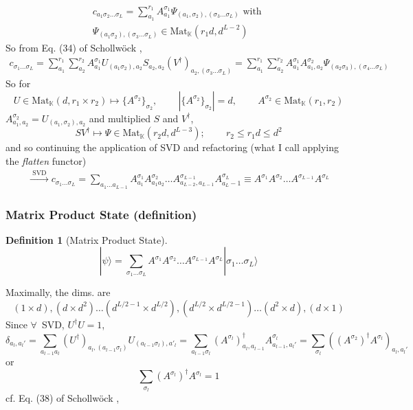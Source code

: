 \documentclass[10pt]{amsart}
\newtheorem{definition}{Definition}
\begin{document}
\begin{multicols*}{2}
\[
\begin{gathered}
c_{a_1\sigma_2 \dots \sigma_L } = \sum_{a_1}^{r_1} A_{a_1}^{\sigma_1} \Psi_{(a_1,\sigma_2),(\sigma_3\dots \sigma_L)} \text{ with } \\
\Psi_{(a_1\sigma_2),(\sigma_3\dots \sigma_L)}\in \text{Mat}_{\mathbb{K}}(r_1d,d^{L-2})
\end{gathered}
\]
So from Eq. (34) of  Schollw\"{o}ck \cite{Scho2010},
\begin{equation}
\begin{gathered}
	c_{\sigma_1 \dots \sigma_L} = \sum_{a_1}^{r_1} \sum_{a_2}^{r_2} A_{a_1}^{\sigma_1} U_{ (a_1\sigma_2) , a_2} S_{a_2,a_2} (V^{\dag})_{a_2, (\sigma_3\dots \sigma_L)} = \sum_{a_1}^{r_1} \sum_{a_2}^{r_2} A_{a_1}^{\sigma_1} A_{a_1,a_2}^{\sigma_2} \Psi_{(a_2\sigma_3), (\sigma_4\dots \sigma_L)}
\end{gathered}
\end{equation}
So for 
\[
U\in \text{Mat}_{\mathbb{K}}(d,r_1\times r_2) \mapsto \lbrace A^{\sigma_2} \rbrace_{\sigma_2}, \qquad \, | \lbrace A^{\sigma_2} \rbrace_{\sigma_2} | = d , \qquad \, A^{\sigma_2} \in \text{Mat}_{\mathbb{K}}(r_1,r_2)
\]
$A^{\sigma_2}_{a_1,a_2} = U_{(a_1,\sigma_2),a_2}$ and multiplied $S$ and $V^{\dag}$, 
\[
SV^{\dag} \mapsto \Psi \in \text{Mat}_{\mathbb{K}}(r_2d, d^{L-3}); \qquad \, r_2 \leq r_1 d \leq d^2
\]
and so continuing the application of SVD and refactoring (what I call applying the \emph{flatten} functor)
\[
\begin{gathered}
\xrightarrow{ \text{ SVD } } c_{\sigma_1 \dots \sigma_L} = \sum_{a_1 \dots a_{L-1}} A^{\sigma_1}_{a_1} A^{\sigma_2}_{a_1 a_2} \dots A^{\sigma_{L-1}}_{a_{L-2}, a_{L-1} } A^{\sigma_L }_{a_L-1 } \equiv A^{\sigma_1} A^{\sigma_2} \dots A^{\sigma_{L-1}} A^{\sigma_L}
\end{gathered}
\]

\subsubsection{Matrix Product State (definition)}

\begin{definition}[Matrix Product State]
\begin{equation}
|\psi \rangle = \sum_{\sigma_1 \dots \sigma_L} A^{\sigma_1}A^{\sigma_2} \dots A^{\sigma_{L-1}} A^{\sigma_L} | \sigma_1 \dots \sigma_L \rangle
\end{equation}
\end{definition}

Maximally, the dims. are 
\[
(1\times d), (d\times d^2) \dots (d^{L/2-1} \times d^{L/2} ), (d^{L/2} \times d^{L/2-1} ) \dots (d^2 \times d), (d\times 1)
\]
Since $\forall \, $ SVD, $U^{\dag} U=1$, 
\[
\delta_{a_l , a_l'} = \sum_{a_{l-1} a_l} (U^{\dag})_{a_l,(a_{l-1} \sigma_l)} U_{(a_{l-1} \sigma_l),a'_l } = \sum_{a_{l-1} \sigma_l} (A^{\sigma_l})^{\dag}_{a_l,a_{l-1}} A^{\sigma_l}_{a_{l-1},a_l'} = \sum_{\sigma_l} ( (A^{\sigma_2})^{\dag} A^{\sigma_l} )_{a_l,a_l'}
\]
or 
\begin{equation}
	\sum_{\sigma_l} (A^{\sigma_l})^{\dag} A^{\sigma_l} = 1
\end{equation}
cf. Eq. (38) of  Schollw\"{o}ck \cite{Scho2010},


\end{multicols*}
\end{document}
